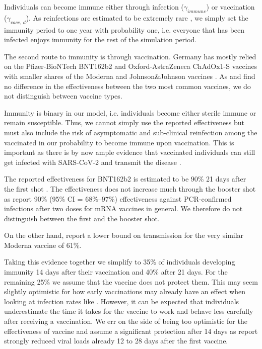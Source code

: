 


Individuals can become immune either through infection ($\gamma_{immune}$) or vaccination
($\gamma_{vacc,\:d}$). As reinfections are estimated to be extremely rare
\citep{AbuRaddad2020}, we simply set the immunity period to one year with probability
one, i.e. everyone that has been infected enjoys immunity for the rest of the simulation
period.

The second route to immunity is through vaccination. Germany has mostly relied on the
Pfizer-BioNTech BNT162b2 and Oxford-AstraZeneca ChAdOx1-S vaccines with smaller shares of
the Moderna and Johnson\&Johnson vaccines \citep{Impfdashboard}. As \citet{Pritchard2021}
and \citet{Harris2021} find no difference in the effectiveness between the two most
common vaccines, we do not distinguish between vaccine types.

Immunity is binary in our model, i.e. individuals become either sterile immune or remain
susceptible. Thus, we cannot simply use the reported effectiveness but must also include
the risk of asymptomatic and sub-clinical reinfection among the vaccinated in our
probability to become immune upon vaccination. This is important as there is by now ample
evidence that vaccinated individuals can still get infected with SARS-CoV-2 and transmit
the disease \citep{Petter2021, LevineTiefenbrun2021, Harris2021}.

The reported effectiveness for BNT162b2 is estimated to be 90\% 21 days after the first
shot \citep{Hunter2021}. The effectiveness does not increase much through the booster
shot as \citet{Thompson2021} report 90\% (95\% CI = 68\%–97\%) effectiveness against
PCR-confirmed infections after two doses for mRNA vaccines in general. We therefore do
not distinguish between the first and the booster shot.

On the other hand, \citet{Lipsitch2021} report a lower bound on transmission for
the very similar Moderna vaccine of 61\%.

Taking this evidence together we simplify to 35\% of individuals developing immunity 14
days after their vaccination and 40\% after 21 days. For the remaining 25\% we assume
that the vaccine does not protect them. %
This may seem slightly optimistic for how early vaccinations may already have an effect
when looking at infection rates like \citet{Hunter2021}. However, it can be expected that
individuals underestimate the time it takes for the vaccine to work and behave less
carefully after receiving a vaccination. We err on the side of being too optimistic for
the effectiveness of vaccine and assume a significant protection after 14 days as
\citet{LevineTiefenbrun2021} report strongly reduced viral loads already 12 to 28 days
after the first vaccine.


\FloatBarrier

